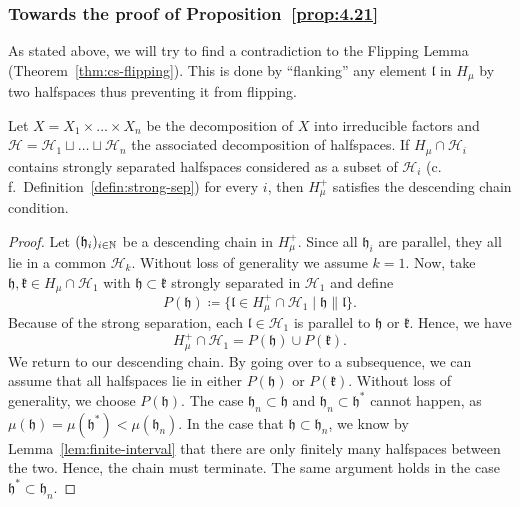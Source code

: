 \subsubsection*{Towards the proof of Proposition~\ref{prop:4.21}}

As stated above, we will try to find a contradiction to the Flipping Lemma (Theorem~\ref{thm:cs-flipping}). This is done by \enquote{flanking} any element \(\mathfrak{l}\) in \(H_\mu\) by two halfspaces thus preventing it from flipping.

\begin{lemma}[{\cite[Lemma~4.18]{MR3509968}}]
  \label{lem:4.18}
  Let \(X = X_1 \times \dots \times X_n\) be the decomposition of \(X\) into irreducible factors and \(\mathcal{H} = \mathcal{H}_1 \sqcup \dots \sqcup \mathcal{H}_n\) the associated decomposition of halfspaces. If \(H_\mu \cap \mathcal{H}_i\) contains strongly separated halfspaces considered as a subset of \(\mathcal{H}_i\) (c.\,f.~Definition~\ref{defin:strong-sep}) for every \(i\), then \(H_\mu^+\) satisfies the descending chain condition.
\end{lemma}

\begin{proof}
  Let \((\mathfrak{h}_i)_{i \in \mathbb{N}}\) be a descending chain in \(H_\mu^+\). Since all \(\mathfrak{h}_i\) are parallel, they all lie in a common \(\mathcal{H}_k\). Without loss of generality we assume \(k=1\). Now, take \(\mathfrak{h, k} \in H_\mu \cap \mathcal{H}_1\) with \(\mathfrak{h} \subset \mathfrak{k}\) strongly separated in \(\mathcal{H}_1\) and define
  \[
    P(\mathfrak{h}) \coloneqq \{\mathfrak{l} \in H_\mu^+ \cap \mathcal{H}_1 \mid \mathfrak{h} \parallel \mathfrak{l}\}.
  \]
  Because of the strong separation, each \(\mathfrak{l} \in \mathcal{H}_1\) is parallel to \(\mathfrak{h}\) or \(\mathfrak{k}\). Hence, we have
  \[
    H_\mu^+ \cap \mathcal{H}_1 = P(\mathfrak{h}) \cup P(\mathfrak{k}).
  \]
  We return to our descending chain. By going over to a subsequence, we can assume that all halfspaces lie in either \(P(\mathfrak{h})\) or \(P(\mathfrak{k})\). Without loss of generality, we choose \(P(\mathfrak{h})\). The case \(\mathfrak{h}_n \subset \mathfrak{h}\) and \(\mathfrak{h}_n \subset \mathfrak{h}^\ast\) cannot happen, as \(\mu(\mathfrak{h}) = \mu(\mathfrak{h}^\ast) < \mu(\mathfrak{h}_n)\). In the case that \(\mathfrak{h} \subset \mathfrak{h}_n\), we know by Lemma~\ref{lem:finite-interval} that there are only finitely many halfspaces between the two. Hence, the chain must terminate. The same argument holds in the case \(\mathfrak{h}^\ast \subset \mathfrak{h}_n\).
\end{proof}


